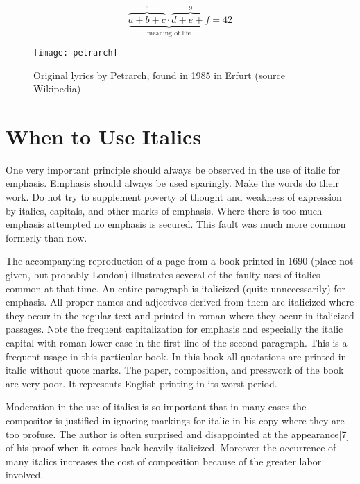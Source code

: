 \[\underbrace{\overbrace{a+b+c}^6
\cdot \overbrace{d+e+f}^9}
_\text{meaning of life} = 42\]

\begin{figure}
\texttt{[image: petrarch]}
\caption{Original lyrics by Petrarch, found in 1985 in Erfurt (source Wikipedia)}
\end{figure}

\chapter{When to Use Italics}

One very important principle should always be observed in the use of italic for emphasis. Emphasis should always be used sparingly. 
Make the words do their work. Do not try to supplement poverty of thought and weakness of expression by italics, capitals, and other marks of emphasis. Where there is too much emphasis attempted no emphasis is secured. This fault was much more common formerly than now.

The accompanying reproduction of a page from a book printed in 1690 (place not given, but probably London) illustrates several of the faulty uses of italics common at that time. An entire paragraph is italicized (quite unnecessarily) for emphasis. All proper names and adjectives derived from them are italicized where they occur in the regular text and printed in roman where they occur in italicized passages. Note the frequent capitalization for emphasis and especially the italic capital with roman lower-case in the first line of the second paragraph. This is a frequent usage in this particular book. In this book all quotations are printed in italic without quote marks. The paper, composition, and presswork of the book are very poor. It represents English printing in its worst period.

Moderation in the use of italics is so important that in many cases the compositor is justified in ignoring markings for italic in his copy where they are too profuse. The author is often surprised and disappointed at the appearance[7] of his proof when it comes back heavily italicized. Moreover the occurrence of many italics increases the cost of composition because of the greater labor involved.

